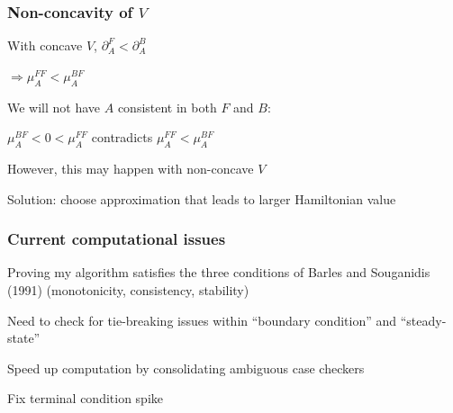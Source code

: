 \documentclass[aspectratio=169]{beamer}
\newenvironment{wideitemize}{\itemize\addtolength{\itemsep}{10pt}}{\enditemize}
\begin{document}
\begin{frame}
    \frametitle{Non-concavity of $V$}

    \begin{wideitemize}
        \item With concave $V$, $\partial_A^F < \partial_A^B$
        \item $\Rightarrow \mu_A^{FF} < \mu_A^{BF}$
        \item We will not have $A$ consistent in both $F$ and $B$:
        \begin{wideitemize}
            \item $\mu_A^{BF} < 0 <\mu_A^{FF}$ contradicts $\mu_A^{FF} < \mu_A^{BF}$
        \end{wideitemize}
        \item However, this may happen with non-concave $V$
        \item Solution: choose approximation that leads to larger Hamiltonian value
    \end{wideitemize}

\end{frame}

\begin{frame}
    \frametitle{Current computational issues}

    \begin{wideitemize}
        \item Proving my algorithm satisfies the three conditions of Barles and Souganidis (1991) (monotonicity, consistency, stability)
        \item Need to check for tie-breaking issues within ``boundary condition'' and ``steady-state''
        \item Speed up computation by consolidating ambiguous case checkers
        \item Fix terminal condition spike
    \end{wideitemize}

\end{frame}
\end{document}
